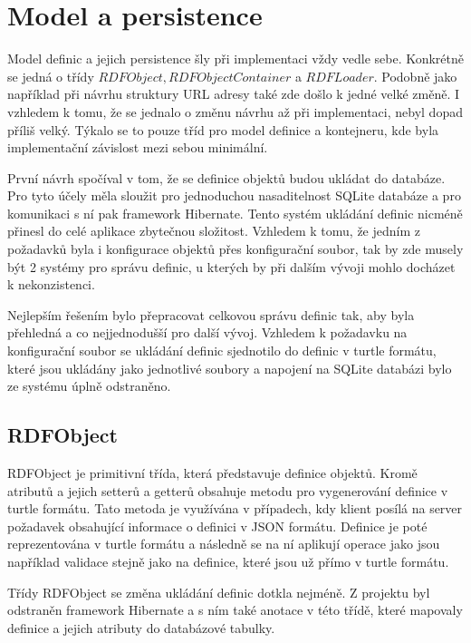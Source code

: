 \documentclass[thesis=B,czech]{FITthesis}[2012/06/26]
\begin{document}
  \section{Model a persistence}
  Model definic a jejich persistence šly při implementaci vždy vedle sebe. Konkrétně se jedná o třídy $RDFObject, RDFObjectContainer$ a $RDFLoader$.
  Podobně jako například při návrhu struktury URL adresy také zde došlo k jedné velké změně. I vzhledem k tomu, že se jednalo o změnu návrhu až při implementaci,
  nebyl dopad příliš velký. Týkalo se to pouze tříd pro model definice a kontejneru, kde byla implementační závislost mezi sebou minimální.
  
  První návrh spočíval v tom, že se definice objektů budou ukládat do databáze. Pro tyto účely měla sloužit pro jednoduchou nasaditelnost SQLite databáze a pro
  komunikaci s ní pak framework Hibernate. Tento systém ukládání definic nicméně přinesl do celé aplikace zbytečnou složitost. Vzhledem k tomu, že jedním z 
  požadavků byla i konfigurace objektů přes konfigurační soubor, tak by zde musely být 2 systémy pro správu definic, u kterých by při dalším vývoji mohlo docházet
  k nekonzistenci.
  
  Nejlepším řešením bylo přepracovat celkovou správu definic tak, aby byla přehledná a co nejjednodušší pro další vývoj.
  Vzhledem k požadavku na konfigurační soubor se ukládání definic sjednotilo do definic v turtle formátu, které jsou ukládány jako jednotlivé soubory a 
  napojení na SQLite databázi bylo ze systému úplně odstraněno.
  
  
  
  
  \subsection{RDFObject}
  RDFObject je primitivní třída, která představuje definice objektů. Kromě atributů a jejich setterů a getterů obsahuje metodu pro vygenerování
  definice v turtle formátu. Tato metoda je využívána v případech, kdy klient posílá na server požadavek obsahující informace o definici v JSON formátu.
  Definice je poté reprezentována v turtle formátu a následně se na ní aplikují operace jako jsou například validace stejně jako na definice, které jsou
  už přímo v turtle formátu.
  
  Třídy RDFObject se změna ukládání definic dotkla nejméně. Z projektu byl odstraněn framework Hibernate a s ním také
  anotace v této třídě, které mapovaly definice a jejich atributy do databázové tabulky.  
  
\end{document}

